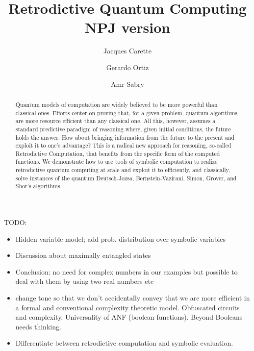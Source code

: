 \documentclass[aps,prl,twocolumn,superscriptaddress,floatfix,notitlepage]{revtex4-2}
\begin{document}
\title{Retrodictive Quantum Computing \\ NPJ version}

\begin{abstract}
Quantum models of computation are widely believed to be more powerful
than classical ones. Efforts center on proving that, for a given
problem, quantum algorithms are more resource efficient than any
classical one. All this, however, assumes a standard predictive
paradigm of reasoning where, given initial conditions, the future
holds the answer. How about bringing information from the future to
the present and exploit it to one's advantage? This is a radical new
approach for reasoning, so-called Retrodictive Computation, that
benefits from the specific form of the computed functions. We
demonstrate how to use tools of symbolic computation to realize
retrodictive quantum computing at scale and exploit it to efficiently,
and classically, solve instances of the quantum Deutsch-Jozsa,
Bernstein-Vazirani, Simon, Grover, and Shor's algorithms.
\end{abstract}

\author{Jacques Carette }
\author{Gerardo Ortiz }
\author{Amr Sabry }

\maketitle

TODO:
\begin{itemize}
\item Hidden variable model; add prob. distribution over symbolic variables
    \item Discussion about maximally entangled states
    \item Conclusion: no need for complex numbers in our examples but possible to deal with them by using two real numbers etc
    \item change tone so that we don't accidentally convey that we are more efficient in a formal and conventional complexity theoretic model. Obfuscated circuits and complexity. Universality of ANF (boolean functions). Beyond Booleans needs thinking. 
    \item Differentiate between retrodictive computation and symbolic evaluation. 
    
\end{itemize}
\end{document}
